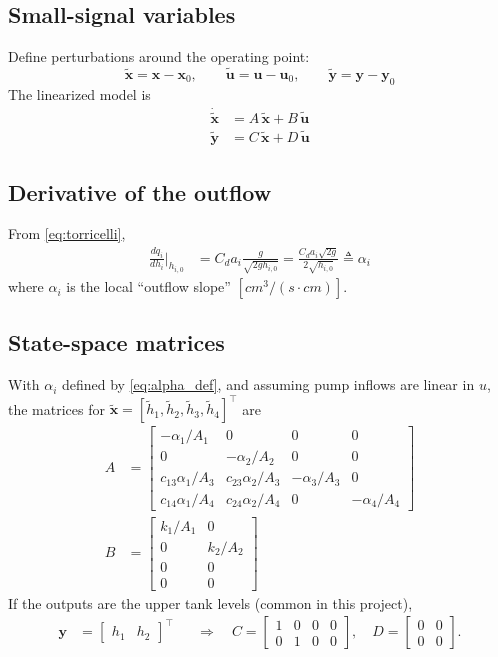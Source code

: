 \documentclass[11pt]{article}
\begin{document}
\subsection{Small-signal variables}
Define perturbations around the operating point:
\[
\tilde{\bm{x}} = \bm{x} - \bm{x}_0,\qquad
\tilde{\bm{u}} = \bm{u} - \bm{u}_0,\qquad
\tilde{\bm{y}} = \bm{y} - \bm{y}_0
\]
The linearized model is
\begin{align}
\dot{\tilde{\bm{x}}} &= A\,\tilde{\bm{x}} + B\,\tilde{\bm{u}}
\label{eq:ss_lin}\\
\tilde{\bm{y}} &= C\,\tilde{\bm{x}} + D\,\tilde{\bm{u}}
\label{eq:out_lin}
\end{align}

\subsection{Derivative of the outflow}
From \eqref{eq:torricelli},
\begin{align}
\frac{d q_i}{d h_i}\bigg|_{h_{i,0}}
&= C_d a_i \frac{g}{\sqrt{2 g h_{i,0}}}
= \frac{C_d a_i \sqrt{2g}}{2\sqrt{h_{i,0}}}
\triangleq \alpha_i
\label{eq:alpha_def}
\end{align}
where \(\alpha_i\) is the local ``outflow slope'' \([\si{cm^3/(s\cdot cm)}]\).

\subsection{State-space matrices}
With \(\alpha_i\) defined by \eqref{eq:alpha_def}, and assuming pump inflows are linear in \(u\),
the matrices for \(\tilde{\bm{x}}=[\tilde{h}_1,\tilde{h}_2,\tilde{h}_3,\tilde{h}_4]^\top\) are
\begin{align}
A &=
\begin{bmatrix}
-\alpha_1/A_1 & 0 & 0 & 0\\
0 & -\alpha_2/A_2 & 0 & 0\\
c_{13}\alpha_1/A_3 & c_{23}\alpha_2/A_3 & -\alpha_3/A_3 & 0\\
c_{14}\alpha_1/A_4 & c_{24}\alpha_2/A_4 & 0 & -\alpha_4/A_4
\end{bmatrix}
\label{eq:A}\\[6pt]
B &=
\begin{bmatrix}
k_1/A_1 & 0\\
0 & k_2/A_2\\
0 & 0\\
0 & 0
\end{bmatrix}
\label{eq:B}
\end{align}
If the outputs are the upper tank levels (common in this project),
\begin{align}
\bm{y} &= \begin{bmatrix} h_1 & h_2 \end{bmatrix}^\top
&&\Rightarrow\quad
C =
\begin{bmatrix}
1 & 0 & 0 & 0\\
0 & 1 & 0 & 0
\end{bmatrix},\quad
D =
\begin{bmatrix}
0 & 0\\
0 & 0
\end{bmatrix}.
\label{eq:CD}
\end{align}
\end{document}
